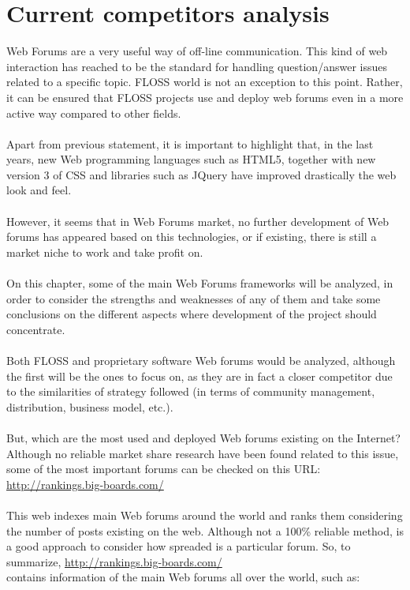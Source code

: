 \documentclass[11pt]{article}
\begin{document}
\section{Current competitors analysis}
Web Forums are a very useful way of off-line communication. This kind of web interaction has reached to be the standard for handling question/answer issues related to a specific topic. FLOSS world is not an exception to this point. Rather, it can be ensured that FLOSS projects use and deploy web forums even in a more active way compared to other fields.\\
\\
Apart from previous statement, it is important to highlight that, in the last years, new Web programming languages such as HTML5, together with new version 3 of CSS and libraries such as JQuery have improved drastically the web look and feel.\\
\\
However, it seems that in Web Forums market, no further development of Web forums has appeared based on this technologies, or if existing, there is still a market niche to work and take profit on.\\
\\
On this chapter, some of the main Web Forums frameworks will be analyzed, in order to consider the strengths and weaknesses of any of them and take some conclusions on the different aspects where development of the project should concentrate.\\
\\
Both FLOSS and proprietary software Web forums would be analyzed, although the first will be the ones to focus on, as they are in fact a closer competitor due to the similarities of strategy followed (in terms of community management, distribution, business model, etc.).\\
\\
But, which are the most used and deployed Web forums existing on the Internet? Although no reliable market share research have been found related to this issue, some of the most important forums can be checked on this URL: \url{http://rankings.big-boards.com/}\\
\\
This web indexes main Web forums around the world and ranks them considering the number of posts existing on the web. Although not a 100\% reliable method, is a good approach to consider how spreaded is a particular forum. So, to summarize, \url{http://rankings.big-boards.com/}\\ contains information of the main Web forums all over the world, such as:
\end{document}
